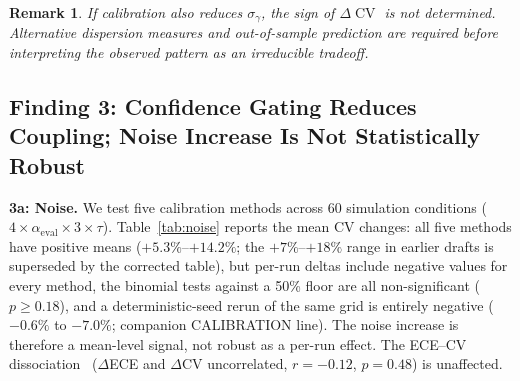 \documentclass[11pt]{article}
\DeclareMathOperator{\CV}{CV}
\newtheorem{remark}{Remark}
\begin{document}
\begin{remark}
If calibration also reduces $\sigma_\gamma$, the sign of $\Delta\CV$ is not determined. Alternative dispersion measures and out-of-sample prediction are required before interpreting the observed pattern as an irreducible tradeoff.
\end{remark}


\subsection{Finding 3: Confidence Gating Reduces Coupling; Noise Increase Is Not Statistically Robust}

\textbf{3a: Noise.} We test five calibration methods across 60 simulation conditions ($4 \times \alpha_{\text{eval}} \times 3 \times \tau$). Table~\ref{tab:noise} reports the mean CV changes: all five methods have positive means ($+5.3\%$--$+14.2\%$; the $+7\%$--$+18\%$ range in earlier drafts is superseded by the corrected table), but per-run deltas include negative values for every method, the binomial tests against a 50\% floor are all non-significant ($p \geq 0.18$), and a deterministic-seed rerun of the same grid is entirely negative ($-0.6\%$ to $-7.0\%$; companion CALIBRATION line). The noise increase is therefore a mean-level signal, not robust as a per-run effect. The ECE--CV dissociation~\citep{tian2023calibration} ($\Delta$ECE and $\Delta$CV uncorrelated, $r = -0.12$, $p = 0.48$) is unaffected.
\end{document}
